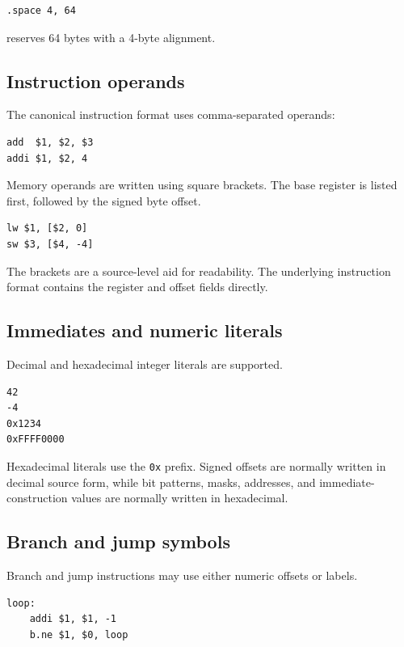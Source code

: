 \begin{verbatim}
.space 4, 64
\end{verbatim}

reserves 64 bytes with a 4-byte alignment.

\subsection{Instruction operands}

The canonical instruction format uses comma-separated operands:

\begin{verbatim}
add  $1, $2, $3
addi $1, $2, 4
\end{verbatim}

Memory operands are written using square brackets. The base register is listed first,
followed by the signed byte offset.

\begin{verbatim}
lw $1, [$2, 0]
sw $3, [$4, -4]
\end{verbatim}

The brackets are a source-level aid for readability. The underlying instruction format
contains the register and offset fields directly.

\subsection{Immediates and numeric literals}

Decimal and hexadecimal integer literals are supported.

\begin{verbatim}
42
-4
0x1234
0xFFFF0000
\end{verbatim}

Hexadecimal literals use the \texttt{0x} prefix. Signed offsets are normally written in
decimal source form, while bit patterns, masks, addresses, and immediate-construction
values are normally written in hexadecimal.

\subsection{Branch and jump symbols}

Branch and jump instructions may use either numeric offsets or labels.

\begin{verbatim}
loop:
    addi $1, $1, -1
    b.ne $1, $0, loop
\end{verbatim}

